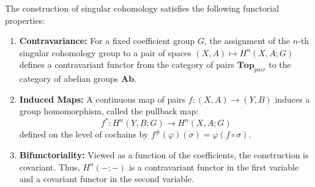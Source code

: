 \begin{proposition} \label{proposition:functoriality_of_singular_cohomology_of_topological_spaces_with_coefficients_in_abelian_groups}
The construction of singular cohomology satisfies the following functorial properties:
\begin{enumerate}
    \item \textbf{Contravariance:} For a fixed coefficient group $G$, the assignment of the $n$-th singular cohomology group to a pair of spaces $(X, A) \mapsto H^n(X, A; G)$ defines a contravariant functor from the category of pairs $\mathbf{Top}_{pair}$ to the category of abelian groups $\mathbf{Ab}$.
    
    \item \textbf{Induced Maps:} A continuous map of pairs $f: (X, A) \to (Y, B)$ induces a group homomorphism, called the pullback map:
    $$f^*: H^n(Y, B; G) \to H^n(X, A; G)$$
    defined on the level of cochains by $f^\#(\varphi)(\sigma) = \varphi(f \circ \sigma)$.
    
    \item \textbf{Bifunctoriality:} Viewed as a function of the coefficients, the construction is covariant. Thus, $H^n(-; -)$ is a contravariant functor in the first variable and a covariant functor in the second variable.
\end{enumerate}
\end{proposition}